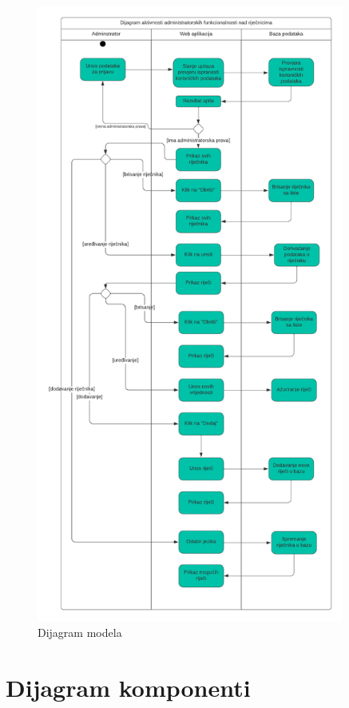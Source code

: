         \begin{figure}[H]
            \includegraphics[width=0.9\textwidth]{dijagrami/Dijagram Aktivnosti.png} 
            \centering
            \caption{Dijagram modela}
            \label{fig:class_diagram}
        \end{figure}	

			\eject
		\section{Dijagram komponenti}
		
			